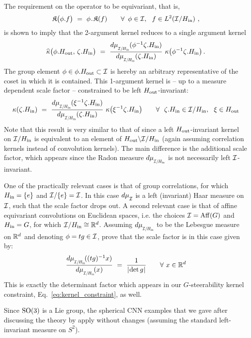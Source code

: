 The requirement on the operator to be equivariant, that is,
\begin{align}
    \mathfrak{K}\big( \phi.f \big)\ =\ \phi \mkern1mu.\mkern1.5mu \mathfrak{K}(f)
    \qquad \forall\,\ \phi\in\mathcal{I},\ \ f\in L^2(\mathcal{I}/H_{\textup{in}}) \ ,
\end{align}
is shown to imply that the 2-argument kernel reduces to a single argument kernel
\begin{align}
    \widehat{\kappa} \big(\phi.\Hout,\, \zeta.\Hin \big)
    \ =\ \frac{\dmuIHin(\phi^{-1} \zeta.\Hin)}{\dmuIHin(\zeta.\Hin)}\ \kappa\big(\phi^{-1} \zeta.\Hin \big) \,.
\end{align}
The group element $\phi\in \phi.H_{\textup{out}} \subset \mathcal{I}$ is hereby an arbitrary representative of the coset in which it is contained.
This 1-argument kernel is -- up to a measure dependent scale factor -- constrained to be left $H_{\textup{out}}$-invariant:
\begin{align}
    \kappa(\zeta.\Hin)\ =\ \frac{\dmuIHin(\xi^{-1} \zeta.\Hin)}{\dmuIHin(\zeta.\Hin)}\ \kappa\big(\xi^{-1} \zeta.\Hin \big)
    \qquad \forall\ \ \zeta.\Hin \in \I/\Hin,\ \ \xi\in\Hout
\end{align}
Note that this result is very similar to that of \citet{Kondor2018-GENERAL} since a left $H_{\textup{out}}$-invariant kernel on $\mathcal{I}/H_{\textup{in}}$ is equivalent to an element of $H_{\textup{out}}\backslash \mathcal{I}/H_{\textup{in}}$ (again assuming correlation kernels instead of convolution kernels).
The main difference is the additional scale factor, which appears since the Radon measure $\dmuIHin$ is not necessarily left $\mathcal{I}$-invariant.


One of the practically relevant cases is that of group correlations, for which $H_{\textup{in}} = \{e\}$ and $\mathcal{I}/\{e\} = \mathcal{I}$.
In this case $d\mu_{\overset{}{\mathcal{I}}}$ is a left (invariant) Haar measure on $\mathcal{I}$, such that the scale factor drops out.
A second relevant case is that of affine equivariant convolutions on Euclidean spaces, i.e. the choices $\mathcal{I} = \operatorname{Aff}(G)$ and $H_{\textup{in}}=G$, for which $\mathcal{I}/H_{\textup{in}} \cong \mathbb{R}^d$.
Assuming $\dmuIHin$ to be the Lebesgue measure on $\mathbb{R}^d$ and denoting $\phi=tg \in \mathcal{I}$, \citet{bekkers2020bspline} prove that the scale factor is in this case given by:
\begin{align}
    \frac{\dmuIHin\!( (tg)^{-1}x )}{\dmuIHin\!(x)}\ =\ \frac{1}{\detg} \qquad \forall\ x\in\R^d
\end{align}
This is exactly the determinant factor which appears in our $G$-steerability kernel constraint, Eq.~\eqref{eq:kernel_constraint}, as well.


Since $\operatorname{SO}(3)$ is a Lie group, the spherical CNN examples that we gave after discussing the theory by \citet{Kondor2018-GENERAL} apply without changes (assuming the standard left-invariant measure on $S^2$).


